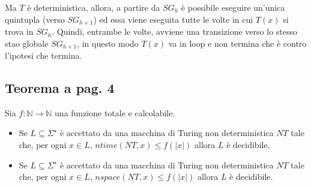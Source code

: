 \begin{enumerate}
{\begin{figure}[h]
        \end{figure}
        Ma $T$ è deterministica, allora, a partire da $SG_{h}$ è possibile eseguire un'unica quintupla (verso $SG_{h + 1}$) ed
        essa viene eseguita tutte le volte in cui $T(x)$ si trova in $SG_{h}$. Quindi, entrambe le volte, avviene una transizione
        verso lo stesso stao globale $SG_{h + 1}$, in questo modo $T(x)$ va in loop e non termina che è contro l'ipotesi che termina.
    }
\end{enumerate}

\newpage
\subsection{Teorema a pag. 4}

Sia $f: \mathbb{N} \rightarrow \mathbb{N}$ una funzione totale e calcolabile.
\begin{itemize}
    \item []{
        Se $L \subseteq \Sigma^{\star}$ è accettato da una macchina di Turing non deterministica $NT$ tale che,
        per ogni $x\in L$, $ntime(NT, x) \leq f(|x|)$ allora $L$ è decidibile.
    }
    \item []{
        Se $L \subseteq \Sigma^{\star}$ è accettato da una macchina di Turing non deterministica $NT$ tale che,
        per ogni $x\in L$, $nspace(NT, x) \leq f(|x|)$ allora $L$ è decidibile.
    }
\end{itemize}

